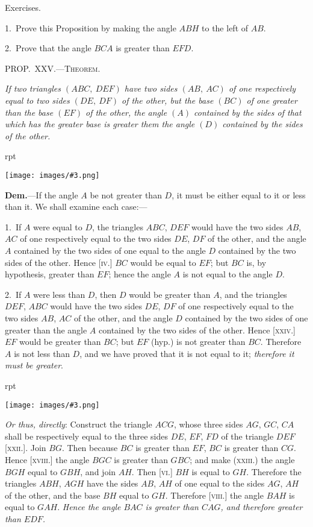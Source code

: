 \documentclass[oneside]{book}
\newcounter{wrapwidth}
\newcommand\mypropl[2]{
\bigskip\Needspace*{4\baselineskip}\begin{center}\textsc{#1}\end{center}
\hspace{\parindent}\emph{#2}\par\medskip
}
\newcommand\exhead[1]{
\Needspace*{5\baselineskip}\begin{center}
\textsf{#1}
\end{center}
}
\newcommand\imgflow[3]{
\setcounter{wrapwidth}{#1}
\begin{wrapfigure}[#2]{r}{\value{wrapwidth}pt}
\begin{center}
\vspace{-0.3in}
\texttt{[image: images/\#3.png]}
\end{center}
\end{wrapfigure}
}
\begin{document}
\exhead{Exercises.}

\begin{footnotesize}
1.~Prove this Proposition by making the angle $ABH$ to the
left of $AB$.

2.~Prove that the angle $BCA$ is greater than $EFD$.
\par\end{footnotesize}


\mypropl{PROP\@.~XXV\@.---Theorem.}{If two triangles $(ABC,\ DEF)$ have two sides $(AB,\ AC)$
of one respectively equal to two sides $(DE,\ DF)$ of the
other, but the base $(BC)$ of one greater than the base
$(EF)$ of the other, the angle $(A)$ contained by the sides of
that which has the greater base is greater them the angle
$(D)$ contained by the sides of the other.}

\imgflow{190}{10}{f042}

\textbf{Dem.}---If the angle $A$ be not greater than $D$, it must
be either equal to
it or less than it.
We shall examine
each case:---

1.~If $A$ were
equal to $D$, the triangles
$ABC$, $DEF$
would have the two
sides $AB$, $AC$ of one
respectively equal
to the two sides $DE$, $DF$ of the other, and the angle $A$
contained by the two sides of one equal to the angle $D$
contained by the two sides of the other. Hence [\textsc{iv}.]
$BC$ would be equal to $EF$; but $BC$ is, by hypothesis,
greater than $EF$; hence the angle $A$ is not equal to
the angle $D$.

2.~If $A$ were less than $D$, then $D$ would be greater
than $A$, and the triangles $DEF$, $ABC$ would have the two
sides $DE$, $DF$ of one respectively equal to the two sides
$AB$, $AC$ of the other, and the angle $D$ contained by the
two sides of one greater than the angle $A$ contained by
the two sides of the other. Hence [\textsc{xxiv}.] $EF$ would be
greater than $BC$; but $EF$ (hyp.) is not greater than $BC$.
Therefore $A$ is not less than $D$, and we have proved
that it is not equal to it; \emph{therefore it must be greater}.

\imgflow{190}{10}{f043}

\emph{Or thus, directly}: Construct the triangle $ACG$, whose
three sides $AG$, $GC$, $CA$ shall be respectively equal to
the three sides $DE$, $EF$, $FD$ of the triangle $DEF$ [\textsc{xxii}.].
Join $BG$. Then because $BC$ is greater than $EF$, $BC$ is
greater than $CG$. Hence [\textsc{xviii}.] the angle $BGC$ is
greater than $GBC$;
and make (\textsc{xxiii}.)
the angle $BGH$ equal
to $GBH$, and join
$AH$. Then [\textsc{vi}.] $BH$
is equal to $GH$.
Therefore the triangles
$ABH$, $AGH$
have the sides $AB$,
$AH$ of one equal to
the sides $AG$, $AH$ of the other, and the base $BH$ equal to
$GH$. Therefore [\textsc{viii}.] the angle $BAH$ is equal to $GAH$.
\emph{Hence the angle $BAC$ is greater than $CAG$, and therefore
greater than $EDF$.}
\end{document}
